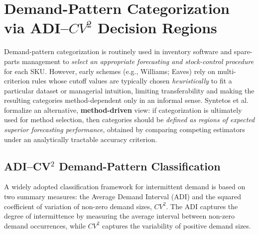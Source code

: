 \vspace{0.5em}
\noindent{}
\vspace{0.8em}

\section{Demand-Pattern Categorization via ADI--$CV^2$ Decision Regions}
\label{sec:demand-pattern-categorization-syntetos2005}

Demand-pattern categorization is routinely used in inventory software and spare-parts management to \emph{select an appropriate forecasting and stock-control procedure} for each SKU. However, early schemes (e.g., Williams; Eaves) rely on multi-criterion rules whose cutoff values are typically chosen \emph{heuristically} to fit a particular dataset or managerial intuition, limiting transferability and making the resulting categories method-dependent only in an informal sense.
%
Syntetos et al.\ \cite{syntetos_categorization_2005} formalize an alternative, \textbf{method-driven} view: if categorization is ultimately used for method selection, then categories should be \emph{defined as regions of expected superior forecasting performance}, obtained by comparing competing estimators under an analytically tractable accuracy criterion.
\subsection{ADI--CV\texorpdfstring{\(^2\)}{2} Demand-Pattern Classification}
\label{subsec:adi_cv2_classification_ch2}

A widely adopted classification framework for intermittent demand is based on two summary measures: the Average Demand Interval (ADI) and the squared coefficient of variation of non-zero demand sizes, \(CV^2\). The ADI captures the degree of intermittence by measuring the average interval between non-zero demand occurrences, while \(CV^2\) captures the variability of positive demand sizes.

